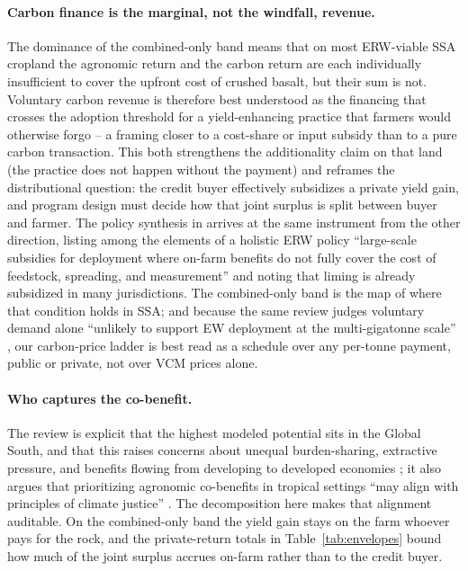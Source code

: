 \documentclass[12pt]{article}
\begin{document}
\paragraph{Carbon finance is the marginal, not the windfall, revenue.}
The dominance of the combined-only band means that on most ERW-viable SSA
cropland the agronomic return and the carbon return are each individually
insufficient to cover the upfront cost of crushed basalt, but their sum is not.
Voluntary carbon revenue is therefore best understood as the financing that
crosses the adoption threshold for a yield-enhancing practice that farmers would
otherwise forgo -- a framing closer to a cost-share or input subsidy than to a
pure carbon transaction. This both strengthens the additionality claim on that
land (the practice does not happen without the payment) and reframes the
distributional question: the credit buyer effectively subsidizes a private
yield gain, and program design must decide how that joint surplus is split
between buyer and farmer. The policy synthesis in
\citet[\S13]{suhrhoff2026esroc} arrives at the same instrument from the other
direction, listing among the elements of a holistic ERW policy ``large-scale
subsidies for deployment where on-farm benefits do not fully cover the cost of
feedstock, spreading, and measurement'' and noting that liming is already
subsidized in many jurisdictions. The combined-only band is the map of where
that condition holds in SSA; and because the same review judges voluntary
demand alone ``unlikely to support EW deployment at the multi-gigatonne scale''
\citep[\S5.3.2]{suhrhoff2026esroc}, our carbon-price ladder is best read as a
schedule over any per-tonne payment, public or private, not over VCM prices
alone.

\paragraph{Who captures the co-benefit.} The review is explicit that the
highest modeled potential sits in the Global South, and that this raises
concerns about unequal burden-sharing, extractive pressure, and benefits flowing
from developing to developed economies \citep[\S7.1,
\S10.2]{suhrhoff2026esroc}; it also argues that prioritizing agronomic
co-benefits in tropical settings ``may align with principles of climate
justice'' \citep[\S5.2.4]{suhrhoff2026esroc}. The decomposition here makes that
alignment auditable. On the combined-only band the yield gain stays on the farm
whoever pays for the rock, and the private-return totals in
Table~\ref{tab:envelopes} bound how much of the joint surplus accrues on-farm
rather than to the credit buyer.
\end{document}
